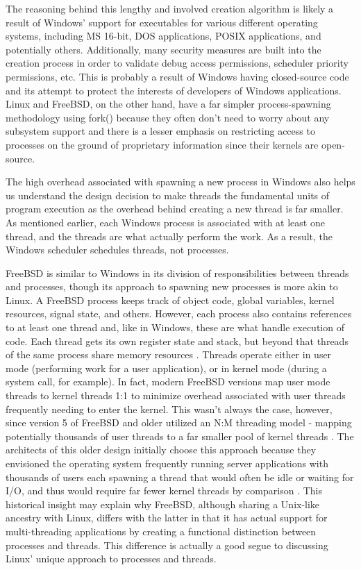 \documentclass[onecolumn, draftclsnofoot,10pt, compsoc]{IEEEtran}
\begin{document}
The reasoning behind this lengthy and involved creation algorithm is likely a result of Windows' support for executables for various different operating systems, including MS 16-bit, DOS applications, POSIX applications, and potentially others. Additionally, many security measures are built into the creation process in order to validate debug access permissions, scheduler priority permissions, etc. This is probably a result of Windows having closed-source code and its attempt to protect the interests of developers of Windows applications. Linux and FreeBSD, on the other hand, have a far simpler process-spawning methodology using fork() because they often don't need to worry about any subsystem support and there is a lesser emphasis on restricting access to processes on the ground of proprietary information since their kernels are open-source.

The high overhead associated with spawning a new process in Windows also helps us understand the design decision to make threads the fundamental units of program execution as the overhead behind creating a new thread is far smaller.  As mentioned earlier, each Windows process is associated with at least one thread, and the threads are what actually perform the work. As a result, the Windows scheduler schedules threads, not processes. 

FreeBSD is similar to Windows in its division of responsibilities between threads and processes, though its approach to spawning new processes is more akin to Linux. A FreeBSD process keeps track of object code, global variables, kernel resources, signal state, and others. However, each process also contains references to at least one thread and, like in Windows, these are what handle execution of code. Each thread gets its own register state and stack, but beyond that threads of the same process share memory resources \cite{FreeBSD}. Threads operate either in user mode (performing work for a user application), or in kernel mode (during a system call, for example). In fact, modern FreeBSD versions map user mode threads to kernel threads 1:1 to minimize overhead associated with user threads frequently needing to enter the kernel. This wasn't always the case, however, since version 5 of FreeBSD and older utilized an N:M threading model - mapping potentially thousands of user threads to a far smaller pool of kernel threads \cite{FreeBSD}. The architects of this older design initially choose this approach because they envisioned the operating system frequently running server applications with thousands of users each spawning a thread that would often be idle or waiting for I/O, and thus would require far fewer kernel threads by comparison \cite{FreeBSD}. This historical insight may explain why FreeBSD, although sharing a Unix-like ancestry with Linux, differs with the latter in that it has actual support for multi-threading applications by creating a functional distinction between processes and threads. This difference is actually a good segue to discussing Linux' unique approach to processes and threads.
\end{document}
